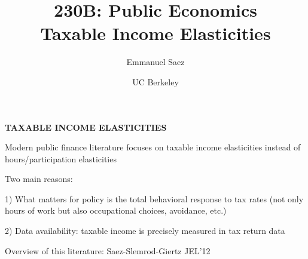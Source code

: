 \documentclass[landscape]{slides}
\author{Emmanuel Saez}
\date{UC Berkeley}
\title{230B: Public Economics \\
Taxable Income Elasticities} \onlyslides{1-300}
\begin{document}
\begin{slide}

\maketitle

\end{slide}

\begin{slide}
\begin{center}
{\bf TAXABLE INCOME ELASTICITIES}
\end{center}

Modern public finance literature focuses on taxable income
elasticities instead of hours/participation elasticities

Two main reasons:

1) What matters for policy is the total behavioral response
to tax rates (not only hours of work but also occupational choices,
avoidance, etc.)

2) Data availability: taxable income is precisely measured in tax
return data

Overview of this literature: Saez-Slemrod-Giertz JEL'12

\end{slide}

%
%
%
%
%

%
%
%
%
%
\end{document}
